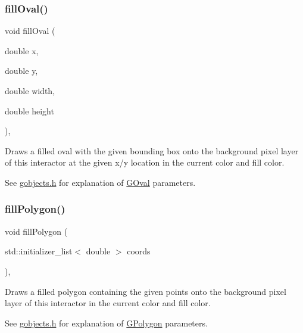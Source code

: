 \subsubsection{\texorpdfstring{fill\+Oval()}{fillOval()}\hspace{0.1cm}{\footnotesize\ttfamily [2/2]}}
{\footnotesize\ttfamily void fill\+Oval (\begin{DoxyParamCaption}\item[{double}]{x,  }\item[{double}]{y,  }\item[{double}]{width,  }\item[{double}]{height }\end{DoxyParamCaption})\hspace{0.3cm}{\ttfamily [virtual]}, {\ttfamily [inherited]}}



Draws a filled oval with the given bounding box onto the background pixel layer of this interactor at the given x/y location in the current color and fill color. 

See \mbox{\hyperlink{gobjects_8h_source}{gobjects.\+h}} for explanation of \mbox{\hyperlink{classGOval}{G\+Oval}} parameters. \mbox{\label{classGDrawingSurface_a15f8c1c4409ef51c1a30a92a195b8f66}} 
\subsubsection{\texorpdfstring{fill\+Polygon()}{fillPolygon()}\hspace{0.1cm}{\footnotesize\ttfamily [1/2]}}
{\footnotesize\ttfamily void fill\+Polygon (\begin{DoxyParamCaption}\item[{std\+::initializer\+\_\+list$<$ double $>$}]{coords }\end{DoxyParamCaption})\hspace{0.3cm}{\ttfamily [virtual]}, {\ttfamily [inherited]}}



Draws a filled polygon containing the given points onto the background pixel layer of this interactor in the current color and fill color. 

See \mbox{\hyperlink{gobjects_8h_source}{gobjects.\+h}} for explanation of \mbox{\hyperlink{classGPolygon}{G\+Polygon}} parameters. \mbox{\label{classGDrawingSurface_a31822d59786156ebf1cc3b2f7fb70330}} 
